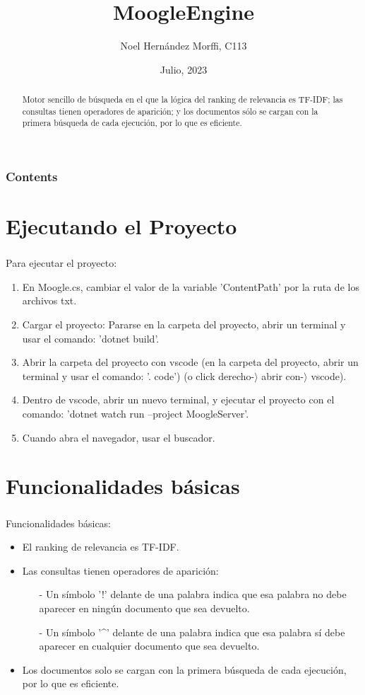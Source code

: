 \documentclass{beamer}
\title{\Huge MoogleEngine}
\author{\Large Noel Hernández Morffi, C113}
\date{\Large Julio, 2023}
\begin{document}
\begin{frame}
\titlepage
\begin{abstract}
  Motor sencillo de búsqueda en el que la lógica del ranking de relevancia es TF-IDF; las consultas tienen operadores de aparición;
   y los documentos sólo se cargan con la primera búsqueda de cada ejecución, por lo que es eficiente.
\end{abstract}
\end{frame}

\begin{frame}
  \frametitle{Contents}
\tableofcontents
\end{frame}

\section{Ejecutando el Proyecto}\label{sec:ejec}
\begin{frame}  
  \frametitle{\insertsection}
Para ejecutar el proyecto:
\begin{enumerate}
    \item En Moogle.cs, cambiar el valor de la variable 'ContentPath' por la ruta de los archivos txt. 
    \item Cargar el proyecto: Pararse en la carpeta del proyecto, abrir un terminal y usar el comando: 'dotnet build'.
    \item Abrir la carpeta del proyecto con vscode (en la carpeta del proyecto, abrir un terminal y usar el comando: '. code')
    (o click derecho-$\rangle$ abrir con-$\rangle$  vscode).
    \item Dentro de vscode, abrir un nuevo terminal, y ejecutar el proyecto con el 
    comando: 'dotnet watch run --project MoogleServer'.
    \item Cuando abra el navegador, usar el buscador. 
\end{enumerate}
\end{frame}

\section{Funcionalidades básicas}\label{sec:func}
\begin{frame}
  \frametitle{\insertsection}
Funcionalidades básicas:
\begin{itemize}
    \item El ranking de relevancia es TF-IDF.
    \item Las consultas tienen operadores de aparición:
    \begin{itemize}
        \item[-] Un símbolo '!' delante de una palabra indica que esa palabra no debe aparecer en ningún documento que sea
         devuelto.
        \item[-] Un símbolo '\textasciicircum' delante de una palabra indica que esa palabra sí debe aparecer en cualquier documento que 
        sea devuelto.
    \end{itemize}
  \item Los documentos solo se cargan con la primera búsqueda de cada ejecución, por lo que es eficiente.
\end{itemize}
\end{frame}
\end{document}
